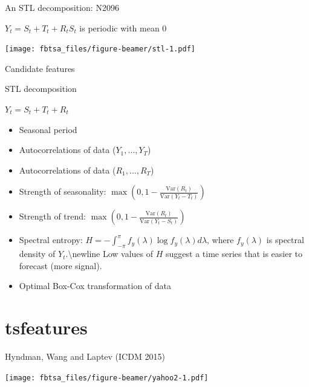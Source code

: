 \documentclass[14pt,ignorenonframetext,]{beamer}
\providecommand{\tightlist}{%
  \setlength{\itemsep}{0pt}\setlength{\parskip}{0pt}}
\def\Var{\text{Var}}
\begin{document}
\begin{frame}{An STL decomposition: N2096}
\protect\hypertarget{an-stl-decomposition-n2096}{}

\begin{alertblock}{}
\centerline{$Y_t = S_t + T_t + R_t$\qquad $S_{t}$ is periodic with mean 0}
\end{alertblock}

\texttt{[image: fbtsa\_files/figure-beamer/stl-1.pdf]}

\end{frame}

\begin{frame}{Candidate features}
\protect\hypertarget{candidate-features}{}

\begin{block}{STL decomposition}
\centerline{$Y_t = S_t + T_t + R_t$}
\end{block}\pause\fontsize{13}{15}\sf

\begin{itemize}
\tightlist
\item
  Seasonal period
\item
  Autocorrelations of data (\(Y_1,\dots,Y_T\))
\item
  Autocorrelations of data (\(R_1,\dots,R_T\))
\item
  Strength of seasonality:
  \(\max\left(0,1 - \frac{\Var(R_t)}{\Var(Y_t-T_t)}\right)\)
\item
  Strength of trend:
  \(\max\left(0,1 - \frac{\Var(R_t)}{\Var(Y_t-S_t)}\right)\)
\item
  Spectral entropy:
  \(H = - \int_{-\pi}^{\pi} f_y(\lambda) \log f_y(\lambda) d\lambda\),
  where \(f_y(\lambda)\) is spectral density of
  \(Y_t\).\textbackslash{}newline Low values of \(H\) suggest a time
  series that is easier to forecast (more signal).
\item
  Optimal Box-Cox transformation of data
\end{itemize}

\end{frame}

\hypertarget{tsfeatures}{%
\section{tsfeatures}\label{tsfeatures}}

\begin{frame}{Hyndman, Wang and Laptev (ICDM 2015)}
\protect\hypertarget{hyndman-wang-and-laptev-icdm-2015}{}

\texttt{[image: fbtsa\_files/figure-beamer/yahoo2-1.pdf]}

\end{frame}
\end{document}
